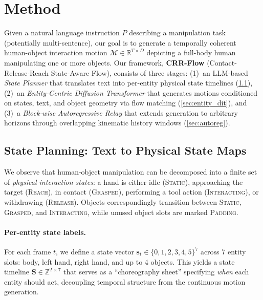 
\section{Method}
\label{sec:method}

Given a natural language instruction $P$ describing a manipulation task (potentially multi-sentence), our goal is to generate a temporally coherent human-object interaction motion $\mathcal{M} \in \mathbb{R}^{T \times D}$ depicting a full-body human manipulating one or more objects. Our framework, \textbf{CRR-Flow} (Contact-Release-Reach State-Aware Flow), consists of three stages: (1)~an LLM-based \emph{State Planner} that translates text into per-entity physical state timelines (\cref{sec:state_planner}), (2)~an \emph{Entity-Centric Diffusion Transformer} that generates motions conditioned on states, text, and object geometry via flow matching (\cref{sec:entity_dit}), and (3)~a \emph{Block-wise Autoregressive Relay} that extends generation to arbitrary horizons through overlapping kinematic history windows (\cref{sec:autoreg}).


\subsection{State Planning: Text to Physical State Maps}
\label{sec:state_planner}

We observe that human-object manipulation can be decomposed into a finite set of \emph{physical interaction states}: a hand is either idle (\textsc{Static}), approaching the target (\textsc{Reach}), in contact (\textsc{Grasped}), performing a tool action (\textsc{Interacting}), or withdrawing (\textsc{Release}). Objects correspondingly transition between \textsc{Static}, \textsc{Grasped}, and \textsc{Interacting}, while unused object slots are marked \textsc{Padding}.

\paragraph{Per-entity state labels.}
For each frame $t$, we define a state vector $\mathbf{s}_t \in \{0,1,2,3,4,5\}^7$ across 7 entity slots: body, left hand, right hand, and up to 4 objects. This yields a state timeline $\mathbf{S} \in \mathbb{Z}^{T \times 7}$ that serves as a ``choreography sheet'' specifying \emph{when} each entity should act, decoupling temporal structure from the continuous motion generation.

